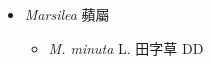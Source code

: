 
  \begin{itemize}
 \item[] \textit{Marsilea} 蘋屬
                                
  \begin{itemize}
        \item[] \textit{M. minuta} L.  田字草   DD
  \end{itemize}
  \end{itemize}
